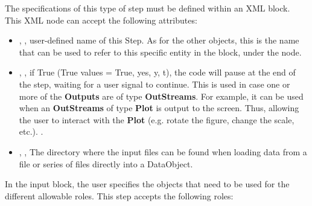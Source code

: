 %
The specifications of this type of step must be defined within an
 XML block.
%
This XML node can accept the following attributes:
\vspace{-5mm}
\begin{itemize}
\itemsep0em
\item {}, , user-defined name of
  this Step.
  \nb As for the other objects, this is the name that can be used to refer to
    this specific entity in the  block, under the
     node.
\item {}, , if True
  (True values = True, yes, y, t), the code will pause at the end of
  the step, waiting for a user signal to continue. This is used in case one or
  more of the \textbf{Outputs} are of type \textbf{OutStreams}.
  For example, it can be used when an \textbf{OutStreams} of type
  \textbf{Plot} is output to the screen. Thus, allowing the user to interact
  with the \textbf{Plot} (e.g. rotate the figure, change the scale, etc.).
.
\item {}, , The directory
  where the input files can be found when loading data from a file or series of
  files directly into a DataObject.
\end{itemize}
\vspace{-5mm}
In the  input block, the user specifies the objects that need to
be used for the different allowable roles.
This step accepts the following roles:
